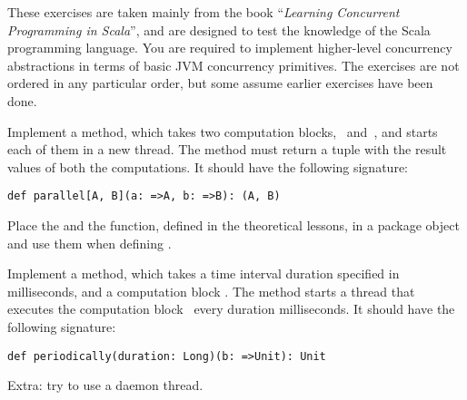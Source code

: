 \documentclass[11pt]{article}
\begin{document}
\myHeader

These exercises are taken mainly from the book ``\emph{Learning Concurrent Programming in Scala}'', and are designed to test the knowledge of the Scala programming language. 
%
You are required to implement higher-level concurrency abstractions in terms of basic JVM concurrency primitives.
The exercises are not ordered in any particular order, but some assume earlier exercises have been done.



\begin{myExercise}Implement a  method, which takes two computation blocks,~ and~, and starts each of them in a new thread. The method must return a tuple with the result values of both the computations. It should have the following signature:
\begin{lstlisting}
def parallel[A, B](a: =>A, b: =>B): (A, B)
\end{lstlisting}
Place the  and the  function, defined in the theoretical lessons, in a package object and use them when defining .
\end{myExercise}

\begin{myExercise}Implement a  method, which takes a time interval duration specified in milliseconds, and a computation block . The method starts a thread that executes the computation block~ every duration milliseconds. It should have the following signature:
\begin{lstlisting}
def periodically(duration: Long)(b: =>Unit): Unit
\end{lstlisting}
Extra: try to use a daemon thread.
\end{myExercise}
\end{document}
